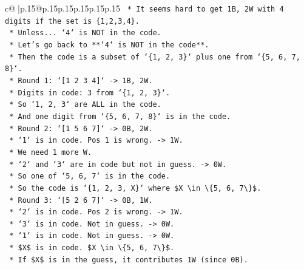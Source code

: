 \documentclass{article}
\begin{document}
{\begin{supertabular}{c@{$\;$}|p{.15\linewidth}@{}p{.15\linewidth}p{.15\linewidth}p{.15\linewidth}p{.15\linewidth}p{.15\linewidth}}
{{{\texttt{                            *   It seems hard to get 1B, 2W with 4 digits if the set is \{1,2,3,4\}.} \\
\texttt{                            *   Unless... `4` is NOT in the code.} \\
\texttt{                            *   Let's go back to **`4` is NOT in the code**.} \\
\texttt{                            *   Then the code is a subset of `\{1, 2, 3\}` plus one from `\{5, 6, 7, 8\}`.} \\
\texttt{                            *   Round 1: `{[}1 2 3 4{]}` {-}> 1B, 2W.} \\
\texttt{                                *   Digits in code: 3 from `\{1, 2, 3\}`.} \\
\texttt{                                *   So `1, 2, 3` are ALL in the code.} \\
\texttt{                                *   And one digit from `\{5, 6, 7, 8\}` is in the code.} \\
\texttt{                            *   Round 2: `{[}1 5 6 7{]}` {-}> 0B, 2W.} \\
\texttt{                                *   `1` is in code. Pos 1 is wrong. {-}> 1W.} \\
\texttt{                                *   We need 1 more W.} \\
\texttt{                                *   `2` and `3` are in code but not in guess. {-}> 0W.} \\
\texttt{                                *   So one of `5, 6, 7` is in the code.} \\
\texttt{                                *   So the code is `\{1, 2, 3, X\}` where \$X \textbackslash{}in \textbackslash{}\{5, 6, 7\textbackslash{}\}\$.} \\
\texttt{                            *   Round 3: `{[}5 2 6 7{]}` {-}> 0B, 1W.} \\
\texttt{                                *   `2` is in code. Pos 2 is wrong. {-}> 1W.} \\
\texttt{                                *   `3` is in code. Not in guess. {-}> 0W.} \\
\texttt{                                *   `1` is in code. Not in guess. {-}> 0W.} \\
\texttt{                                *   \$X\$ is in code. \$X \textbackslash{}in \textbackslash{}\{5, 6, 7\textbackslash{}\}\$.} \\
\texttt{                                *   If \$X\$ is in the guess, it contributes 1W (since 0B).} \\
}}}
\end{supertabular}}
\end{document}
